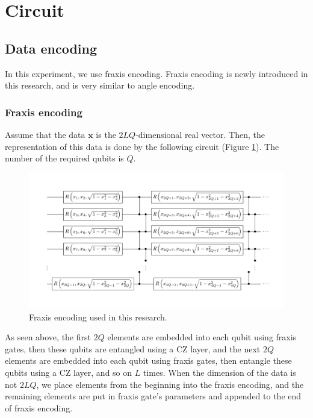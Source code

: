 \section{Circuit}
\subsection{Data encoding}
\par In this experiment, we use fraxis encoding. Fraxis encoding is newly introduced in this research, and is very similar to angle encoding.

\subsubsection{Fraxis encoding}
\par Assume that the data $\bm{x}$ is the $2LQ$-dimensional real vector. Then, the representation of this data is done by the following circuit (Figure \ref{fig:fraxis_enco}). The number of the required qubits is $Q$. 

\begin{figure}[H]
    \centering
    \includegraphics[keepaspectratio, scale=0.5]{experiment/figure/fraxis_enco.pdf}
    \caption{Fraxis encoding used in this research.}
    \label{fig:fraxis_enco}
\end{figure}

\par As seen above, the first $2Q$ elements are embedded into each qubit using fraxis gates, then these qubits are entangled using a CZ layer, and the next $2Q$ elements are embedded into each qubit using fraxis gates, then entangle these qubits using a CZ layer, and so on $L$ times. When the dimension of the data is not $2LQ$, we place elements from the beginning into the fraxis encoding, and the remaining elements are put in fraxis gate's parameters and appended to the end of fraxis encoding.

